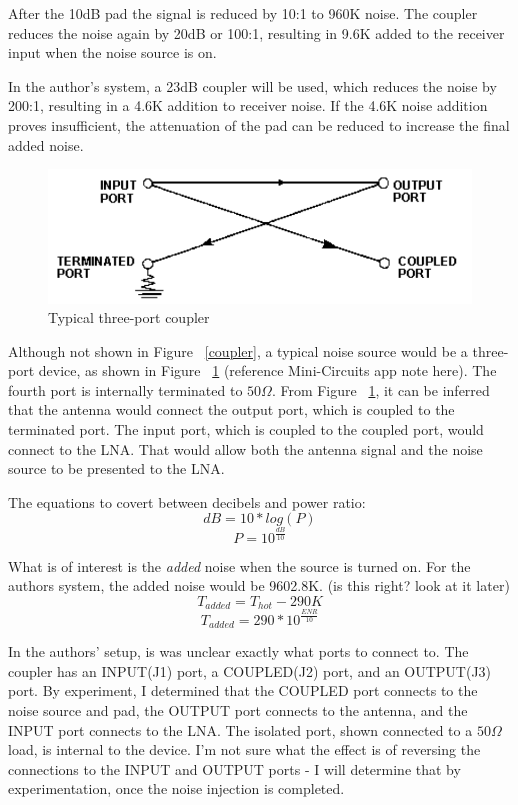 \documentclass[letterpaper, 12pt]{article}
\begin{document}
After the 10dB pad the signal is reduced by 10:1 to 960K noise. The coupler reduces the noise again by 20dB or 100:1, resulting in 9.6K added to the receiver input when the noise source is on. 

\begin{tcolorbox}[enhanced jigsaw,sharp corners,coltext=black,colback=lightgray,boxrule=0pt]
In the author's system, a 23dB coupler will be used, which reduces the noise by 200:1, resulting in a 4.6K addition to receiver noise. If the 4.6K noise addition proves insufficient, the attenuation of the pad can be reduced to increase the final added noise.
\end{tcolorbox}

\begin{figure}[h!]
	\centering
	\includegraphics[scale=0.3]{threeport.png}
	\caption{Typical three-port coupler}
	\label{3PORT}
\end{figure}

Although not shown in Figure ~\ref{coupler}, a typical noise source would be a three-port device, as shown in Figure ~\ref{3PORT} {\color{red}(reference Mini-Circuits app note here)}. The fourth port is internally terminated to $50\Omega$. From Figure ~\ref{3PORT}, it can be inferred that the antenna would connect the output port, which is coupled to the terminated port. The input port, which is coupled to the coupled port, would connect to the LNA. That would allow both the antenna signal and the noise source to be presented to the LNA.

The equations to covert between decibels and power ratio:
$$dB = 10 * log(P)$$
$$P = 10^{\frac{dB}{10}}$$

What is of interest is the \textit{added} noise when the source is turned on.  For the authors system, the added noise would be 9602.8K. {\color{red}(is this right? look at it later)}
$$T_{added} = T_{hot} - 290K$$
$$T_{added} = 290 * 10^{\frac{ENR}{10}}$$

\begin{tcolorbox}[enhanced jigsaw,sharp corners,coltext=black,colback=lightgray,boxrule=0pt]
In the authors' setup, is was unclear exactly what ports to connect to. The coupler has an INPUT(J1) port, a COUPLED(J2) port, and an OUTPUT(J3) port. By experiment, I determined that the COUPLED port connects to the noise source and pad, the OUTPUT port connects to the antenna, and the INPUT port connects to the LNA. The isolated port, shown connected to a $50\Omega$ load, is internal to the device. I'm not sure what the effect is of reversing the connections to the INPUT and OUTPUT ports - I will determine that by experimentation, once the noise injection is completed.
\end{tcolorbox}
\end{document}
